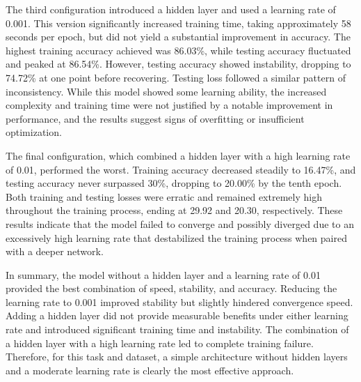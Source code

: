 \documentclass[a4paper]{article}
\begin{document}
The third configuration introduced a hidden layer and used a learning rate of 0.001. This version significantly increased training time, taking approximately 58 seconds per epoch, but did not yield a substantial improvement in accuracy. The highest training accuracy achieved was 86.03\%, while testing accuracy fluctuated and peaked at 86.54\%. However, testing accuracy showed instability, dropping to 74.72\% at one point before recovering. Testing loss followed a similar pattern of inconsistency. While this model showed some learning ability, the increased complexity and training time were not justified by a notable improvement in performance, and the results suggest signs of overfitting or insufficient optimization.

The final configuration, which combined a hidden layer with a high learning rate of 0.01, performed the worst. Training accuracy decreased steadily to 16.47\%, and testing accuracy never surpassed 30\%, dropping to 20.00\% by the tenth epoch. Both training and testing losses were erratic and remained extremely high throughout the training process, ending at 29.92 and 20.30, respectively. These results indicate that the model failed to converge and possibly diverged due to an excessively high learning rate that destabilized the training process when paired with a deeper network.

In summary, the model without a hidden layer and a learning rate of 0.01 provided the best combination of speed, stability, and accuracy. Reducing the learning rate to 0.001 improved stability but slightly hindered convergence speed. Adding a hidden layer did not provide measurable benefits under either learning rate and introduced significant training time and instability. The combination of a hidden layer with a high learning rate led to complete training failure. Therefore, for this task and dataset, a simple architecture without hidden layers and a moderate learning rate is clearly the most effective approach.
\end{document}
